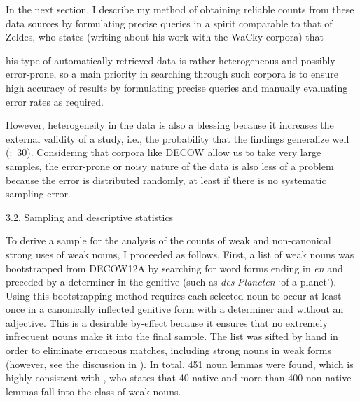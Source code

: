 \begin{styleMoutonText}
In the next section, I describe my method of obtaining reliable counts from these data sources by formulating precise queries in a spirit comparable to that of Zeldes, who states (writing about his work with the WaCky corpora) that
\end{styleMoutonText}

\begin{styleMoutonQuote}
[t]his type of automatically retrieved data is rather heterogeneous and possibly error-prone, so a main priority in searching through such corpora is to ensure high accuracy of results by formulating precise queries and manually evaluating error rates as required. \citep[97]{Zeldes2012}
\end{styleMoutonQuote}

\begin{styleMoutonText}
However, heterogeneity in the data is also a blessing because it increases the external validity of a study, i.e., the probability that the findings generalize well (\citealt{MaxwellDelaney2004}:~30). Considering that corpora like DECOW allow us to take very large samples, the error-prone or noisy nature of the data is also less of a problem because the error is distributed randomly, at least if there is no systematic sampling error.
\end{styleMoutonText}

\begin{styleMoutonHeadingii}
3.2. Sampling and descriptive statistics
\end{styleMoutonHeadingii}

\begin{styleMoutonText}
To derive a sample for the analysis of the counts of weak and non-canonical strong uses of weak nouns, I proceeded as follows. First, a list of weak nouns was bootstrapped from DECOW12A by searching for word forms ending in \textit{en} and preceded by a determiner in the genitive (such as \textit{des} \textit{Planeten} ‘of a planet’). Using this bootstrapping method requires each selected noun to occur at least once in a canonically inflected genitive form with a determiner and without an adjective. This is a desirable by-effect because it ensures that no extremely infrequent nouns make it into the final sample. The list was sifted by hand in order to eliminate erroneous matches, including strong nouns in weak forms (however, see the discussion in ). In total, 451 noun lemmas were found, which is highly consistent with \citet[98]{Bittner2003}, who states that 40 native and more than 400 non-native lemmas fall into the class of weak nouns.
\end{styleMoutonText}

